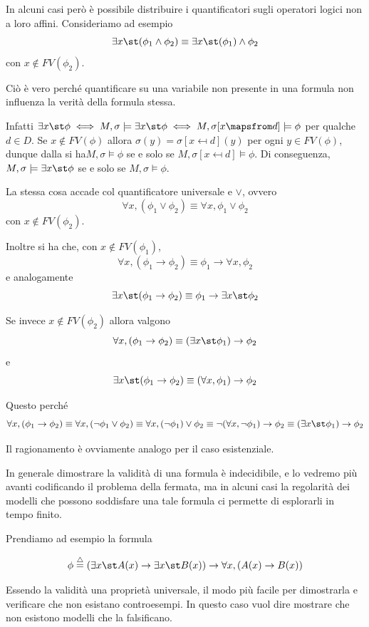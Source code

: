 In alcuni casi però è possibile distribuire i quantificatori sugli operatori logici non a loro affini. Consideriamo ad esempio 
\[\exists x\st(\phi_1 \land \phi_2) \equiv \exists x\st( \phi_1) \land \phi_2\]
con \(x \notin FV(\phi_2)\).

Ciò è vero perché quantificare su una variabile non presente in una formula non influenza la verità della formula stessa.

Infatti \(\exists x\st\phi\iff M,\sigma \models \exists x\st\phi \iff M,\sigma[x\mapsfrom d] \models \phi \) per qualche \(d\in D\). Se \(x \notin FV(\phi)\) allora \(\sigma(y)=\sigma[x\mapsfrom d](y)\) per ogni \(y \in FV(\phi)\), dunque dalla  si ha\(M,\sigma \models \phi\) se e solo se \(M,\sigma[x\mapsfrom d] \models \phi\). Di conseguenza, \(M,\sigma \models \exists x\st\phi\) se e solo se \(M,\sigma \models \phi\).

La stessa cosa accade col quantificatore universale e \(\lor\), ovvero
\[\forall x, (\phi_1 \lor \phi_2) \equiv \forall x, \phi_1 \lor \phi_2\]
con \(x \notin FV(\phi_2)\).

Inoltre si ha che, con \(x \notin FV(\phi_1)\),
\[\forall x, (\phi_1 \to \phi_2) \equiv \phi_1 \to \forall x, \phi_2\]
e analogamente
\[\exists x\st (\phi_1 \to \phi_2) \equiv \phi_1 \to \exists x\st \phi_2\]

Se invece \(x \notin FV(\phi_2)\) allora valgono
\[\forall x, (\phi_1 \to \phi_2) \equiv (\exists x\st \phi_1 )\to \phi_2\]
e
\[\exists x\st (\phi_1 \to \phi_2) \equiv (\forall x, \phi_1 )\to \phi_2\]

Questo perché 
\[\forall x, (\phi_1 \to \phi_2) \equiv \forall x, (\neg \phi_1 \lor \phi_2) \equiv \forall x, (\neg \phi_1 )\lor \phi_2 \equiv \neg (\forall x, \neg \phi_1) \to \phi_2 \equiv (\exists x\st \phi_1)\to \phi_2\]

Il ragionamento è ovviamente analogo per il caso esistenziale.

In generale dimostrare la validità di una formula è indecidibile, e lo vedremo più avanti codificando il problema della fermata, ma in alcuni casi la regolarità dei modelli che possono soddisfare una tale formula ci permette di esplorarli in tempo finito.

Prendiamo ad esempio la formula

\[\phi \eqdef (\exists x\st A(x)\to \exists x\st B(x))\to \forall x, (A(x)\to B(x))\]

Essendo la validità una proprietà universale, il modo più facile per dimostrarla e verificare che non esistano controesempi.
In questo caso vuol dire mostrare che non esistono modelli che la falsificano.

